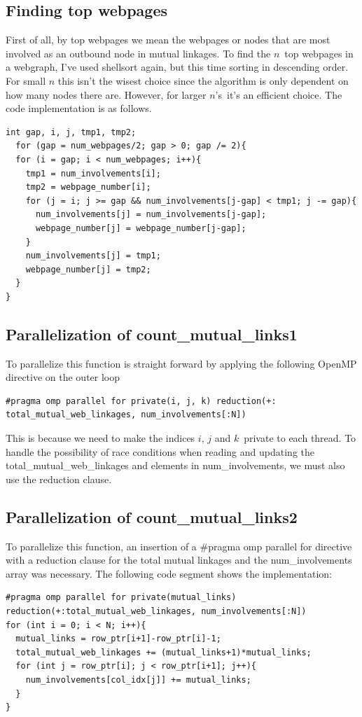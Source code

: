 \documentclass[english,notitlepage, reprint]{revtex4-1}  %
\begin{document}
\subsection*{Finding top webpages}
First of all, by top webpages we mean the webpages or nodes that are most involved as an outbound node in mutual linkages. To find the $n$ top webpages in a webgraph, I've used shellsort again, but this time sorting in descending order. For small $n$ this isn't the wisest choice since the algorithm is only dependent on how many nodes there are. However, for larger $n$'s it's an efficient choice. The code implementation is as follows.
\begin{lstlisting}[style=customc]
int gap, i, j, tmp1, tmp2;
  for (gap = num_webpages/2; gap > 0; gap /= 2){
  for (i = gap; i < num_webpages; i++){
    tmp1 = num_involvements[i];
    tmp2 = webpage_number[i];
    for (j = i; j >= gap && num_involvements[j-gap] < tmp1; j -= gap){
      num_involvements[j] = num_involvements[j-gap];
      webpage_number[j] = webpage_number[j-gap];
    }
    num_involvements[j] = tmp1;
    webpage_number[j] = tmp2;
  }
}
\end{lstlisting}

\subsection*{Parallelization of count\_mutual\_links1}
To parallelize this function is straight forward by applying the following OpenMP directive on the outer loop
\begin{lstlisting}[style=customc]
#pragma omp parallel for private(i, j, k) reduction(+: total_mutual_web_linkages, num_involvements[:N])
\end{lstlisting}
This is because we need to make the indices $i$, $j$ and $k$ private to each thread. To handle the possibility of race conditions when reading and updating the total\_mutual\_web\_linkages
and elements in num\_involvements, we must also use the reduction clause.

\subsection*{Parallelization of count\_mutual\_links2}
To parallelize this function, an insertion of a \#pragma omp parallel for directive with a reduction clause for the total mutual linkages and the num\_involvements array was necessary. The following code segment shows the implementation:
\begin{lstlisting}[style=customc]
#pragma omp parallel for private(mutual_links) reduction(+:total_mutual_web_linkages, num_involvements[:N])
for (int i = 0; i < N; i++){
  mutual_links = row_ptr[i+1]-row_ptr[i]-1;
  total_mutual_web_linkages += (mutual_links+1)*mutual_links;
  for (int j = row_ptr[i]; j < row_ptr[i+1]; j++){
    num_involvements[col_idx[j]] += mutual_links;    
  }
}
\end{lstlisting}
\end{document}
